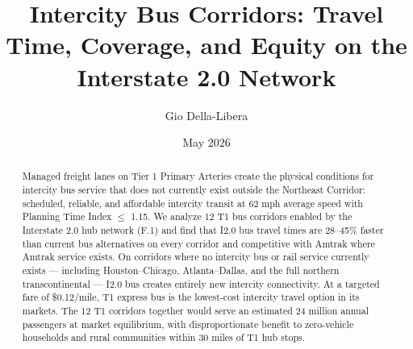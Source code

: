 \documentclass[12pt]{article}
\title{Intercity Bus Corridors: Travel Time, Coverage, and Equity on the Interstate 2.0 Network}
\author{Gio Della-Libera}
\date{May 2026}
\begin{document}
\maketitle
\begin{abstract}
Managed freight lanes on Tier 1 Primary Arteries create the physical conditions for intercity bus service that does not currently exist outside the Northeast Corridor: scheduled, reliable, and affordable intercity transit at 62 mph average speed with Planning Time Index $\leq$ 1.15. We analyze 12 T1 bus corridors enabled by the Interstate 2.0 hub network (F.1) and find that I2.0 bus travel times are 28--45\% faster than current bus alternatives on every corridor and competitive with Amtrak where Amtrak service exists. On corridors where no intercity bus or rail service currently exists --- including Houston--Chicago, Atlanta--Dallas, and the full northern transcontinental --- I2.0 bus creates entirely new intercity connectivity. At a targeted fare of \$0.12/mile, T1 express bus is the lowest-cost intercity travel option in its markets. The 12 T1 corridors together would serve an estimated 24 million annual passengers at market equilibrium, with disproportionate benefit to zero-vehicle households and rural communities within 30 miles of T1 hub stops.
\end{abstract}









\end{document}
